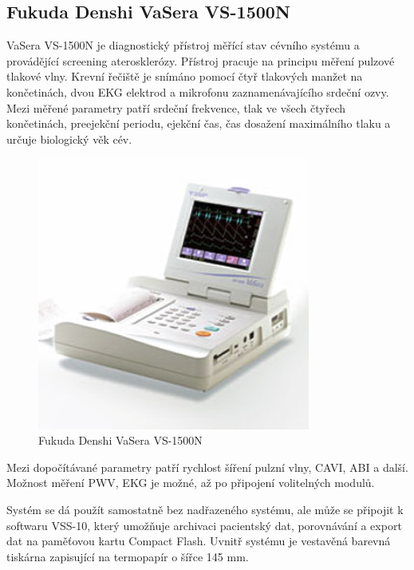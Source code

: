 \subsection{Fukuda Denshi VaSera VS-1500N}
VaSera VS-1500N je diagnostický přístroj měřící stav cévního systému a provádějící screening aterosklerózy. Přístroj pracuje na principu měření pulzové tlakové vlny. Krevní řečiště je snímáno pomocí čtyř tlakových manžet na končetinách, dvou EKG elektrod a mikrofonu zaznamenávajícího srdeční ozvy.
Mezi měřené parametry patří srdeční frekvence, tlak ve všech čtyřech končetinách, preejekční periodu, ejekční čas, čas dosažení maximálního tlaku a určuje biologický věk cév.\cite{cite:Vasera}
\begin{figure}[H]
    \caption{Fukuda Denshi VaSera VS-1500N \cite{cite:Vasera}}
    \includegraphics[width=0.8\textwidth]{pictures/vs_1500n.jpg}
\end{figure}
Mezi dopočítávané parametry patří rychlost šíření pulzní vlny, CAVI, ABI a další. Možnost měření PWV, EKG je možné, až po připojení volitelných modulů.\cite{cite:Vasera}
\par
Systém se dá použít samostatně bez nadřazeného systému, ale může se připojit k softwaru VSS-10, který umožňuje archivaci pacientský dat, porovnávání a export dat na paměťovou kartu Compact Flash. Uvnitř systému je
vestavěná barevná tiskárna zapisující na termopapír o šířce 145 mm.\cite{cite:Vasera}
